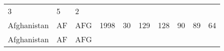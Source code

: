 \documentclass[]{article}
\begin{document}
\begin{longtable}[]{@{}llllllllll@{}}
\begin{minipage}[t]{0.09\columnwidth}
3\strut
\end{minipage} & \begin{minipage}[t]{0.09\columnwidth}\raggedright\strut
5\strut
\end{minipage} & \begin{minipage}[t]{0.09\columnwidth}\raggedright\strut
2\strut
\end{minipage}\tabularnewline
\begin{minipage}[t]{0.08\columnwidth}\raggedright\strut
Afghanistan\strut
\end{minipage} & \begin{minipage}[t]{0.04\columnwidth}\raggedright\strut
AF\strut
\end{minipage} & \begin{minipage}[t]{0.04\columnwidth}\raggedright\strut
AFG\strut
\end{minipage} & \begin{minipage}[t]{0.04\columnwidth}\raggedright\strut
1998\strut
\end{minipage} & \begin{minipage}[t]{0.08\columnwidth}\raggedright\strut
30\strut
\end{minipage} & \begin{minipage}[t]{0.09\columnwidth}\raggedright\strut
129\strut
\end{minipage} & \begin{minipage}[t]{0.09\columnwidth}\raggedright\strut
128\strut
\end{minipage} & \begin{minipage}[t]{0.09\columnwidth}\raggedright\strut
90\strut
\end{minipage} & \begin{minipage}[t]{0.09\columnwidth}\raggedright\strut
89\strut
\end{minipage} & \begin{minipage}[t]{0.09\columnwidth}\raggedright\strut
64\strut
\end{minipage}\tabularnewline
\begin{minipage}[t]{0.08\columnwidth}\raggedright\strut
Afghanistan\strut
\end{minipage} & \begin{minipage}[t]{0.04\columnwidth}\raggedright\strut
AF\strut
\end{minipage} & \begin{minipage}[t]{0.04\columnwidth}\raggedright\strut
AFG\strut
\end{minipage} & \begin{minipage}[t]{0.04\columnwidth}\raggedright\strut

\end{minipage}
\end{longtable}
\end{document}
